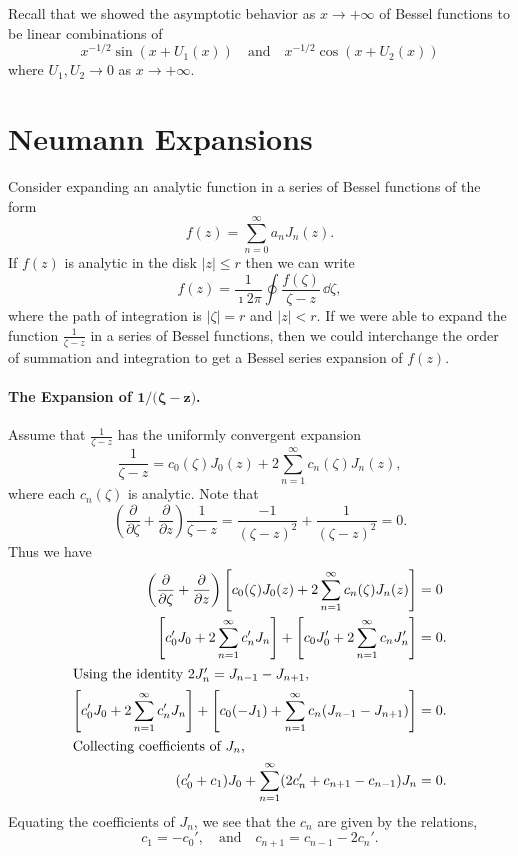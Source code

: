 Recall that we showed the asymptotic behavior as $x \to +\infty$
of Bessel functions to be linear combinations of
\[ 
x^{-1/2} \sin(x + U_1(x)) \quad \mathrm{and} \quad 
x^{-1/2} \cos(x + U_2(x)) 
\]
where $U_1, U_2 \to 0$ as $x \to +\infty$.






\section{Neumann Expansions}


Consider expanding an analytic function in a series of Bessel functions of
the form
\[ 
f(z) = \sum_{n = 0}^\infty a_n J_n(z). 
\]
If $f(z)$ is analytic in the disk $|z| \leq r$ then we can write
\[ 
f(z) = \frac{1}{\imath 2 \pi} \oint \frac{f(\zeta)}{\zeta - z}\,\dd \zeta ,
\]
where the path of integration is $|\zeta| = r$ and $|z| < r$.  
If we were able to expand the function $\frac{1}{\zeta-z}$ in a series of 
Bessel functions, then we could interchange the order of summation and 
integration to get a Bessel series expansion of $f(z)$.  



\paragraph{The Expansion of $\mathbf{1 \boldsymbol{/} \boldsymbol{(} 
\boldsymbol{\zeta} - z \boldsymbol{)} }$.}
Assume that $\frac{1}{\zeta-z}$ has the uniformly convergent expansion
\[ 
\frac{1}{\zeta-z} = c_0(\zeta) J_0(z) + 2 \sum_{n = 1}^\infty c_n(\zeta) J_n(z), 
\]
where each $c_n(\zeta)$ is analytic.
Note that
\[ 
\left( \frac{\partial}{\partial \zeta} + \frac{\partial}{\partial z} \right) \frac{1}{\zeta-z}
= \frac{-1}{(\zeta-z)^2} + \frac{1}{(\zeta-z)^2} = 0. 
\]
Thus we have
\begin{align*}
  \left( \frac{\partial}{\partial \zeta} + \frac{\partial}{\partial z} \right) \left[ c_0(\zeta) J_0(z)
    + 2 \sum_{n = 1}^\infty c_n(\zeta) J_n(z) \right] &= 0 
  \\
  \left[ c_0' J_0 + 2 \sum_{n = 1}^\infty c_n' J_n \right] + \left[ c_0 J_0' + 
    2 \sum_{n = 1}^\infty c_n J_n' \right] &= 0. 
  \\
  \intertext{Using the identity $2J_n' = J_{n-1} - J_{n+1}$,}
  \left[ c_0' J_0 + 2 \sum_{n = 1}^\infty c_n' J_n \right] + \left[ c_0 (-J_1) + 
    \sum_{n = 1}^\infty c_n (J_{n-1} - J_{n+1}) \right] &= 0. 
  \\
  \intertext{Collecting coefficients of $J_n$, }
  (c_0' + c_1) J_0 + \sum_{n = 1}^\infty (2c_n' + c_{n+1} - c_{n-1})J_n &= 0.
\end{align*}
Equating the coefficients of $J_n$, we see that the $c_n$ are given by the 
relations,
\[ 
c_1 = -c_0', \quad \mathrm{and} \quad 
c_{n+1} = c_{n-1} - 2 c_n'. 
\]


